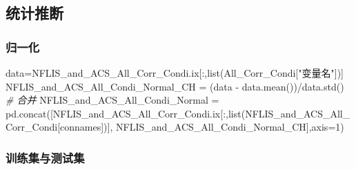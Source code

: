 \documentclass[
]{article}
\newenvironment{Shaded}{}{}
\newcommand{\BuiltInTok}[1]{#1}
\newcommand{\CommentTok}[1]{\textcolor[rgb]{0.38,0.63,0.69}{\textit{#1}}}
\newcommand{\DecValTok}[1]{\textcolor[rgb]{0.25,0.63,0.44}{#1}}
\newcommand{\NormalTok}[1]{#1}
\newcommand{\OperatorTok}[1]{\textcolor[rgb]{0.40,0.40,0.40}{#1}}
\newcommand{\StringTok}[1]{\textcolor[rgb]{0.25,0.44,0.63}{#1}}
\begin{document}
\hypertarget{header-n275}{%
\subsection{统计推断}\label{header-n275}}

\hypertarget{header-n276}{%
\subsubsection{归一化}\label{header-n276}}

\begin{Shaded}
\begin{Highlighting}[]
\NormalTok{data}\OperatorTok{=}\NormalTok{NFLIS\_and\_ACS\_All\_Corr\_Condi.ix[:,}\BuiltInTok{list}\NormalTok{(All\_Corr\_Condi[}\StringTok{"变量名"}\NormalTok{])]}
\NormalTok{NFLIS\_and\_ACS\_All\_Condi\_Normal\_CH }\OperatorTok{=}\NormalTok{ (data }\OperatorTok{{-}}\NormalTok{ data.mean())}\OperatorTok{/}\NormalTok{data.std() }
\CommentTok{\# 合并}
\NormalTok{NFLIS\_and\_ACS\_All\_Condi\_Normal }\OperatorTok{=}\NormalTok{ pd.concat([NFLIS\_and\_ACS\_All\_Corr\_Condi.ix[:,}\BuiltInTok{list}\NormalTok{(NFLIS\_and\_ACS\_All\_Corr\_Condi[connames])],}
\NormalTok{                                            NFLIS\_and\_ACS\_All\_Condi\_Normal\_CH],axis}\OperatorTok{=}\DecValTok{1}\NormalTok{)}
\end{Highlighting}
\end{Shaded}

\hypertarget{header-n281}{%
\subsubsection{训练集与测试集}\label{header-n281}}
\end{document}
